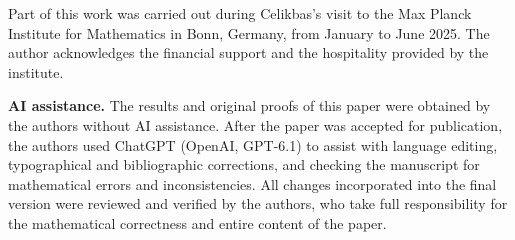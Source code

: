 \documentclass[11pt]{amsart}
\theoremstyle{definition}
\theoremstyle{definition}
\numberwithin{equation}{section}
\begin{document}
Part of this work was carried out during Celikbas's visit to the Max Planck Institute for Mathematics in Bonn, Germany, from January to June 2025. The author acknowledges the financial support and the hospitality provided by the institute.

\medskip
\noindent\textbf{AI assistance.} The results and original proofs of this paper were obtained by the authors without AI assistance. After the paper was accepted for publication, the authors used ChatGPT (OpenAI, GPT-6.1) to assist with language editing, typographical and bibliographic corrections, and checking the manuscript for mathematical errors and inconsistencies. All changes incorporated into the final version were reviewed and verified by the authors, who take full responsibility for the mathematical correctness and entire content of the paper.
 
\end{document}
